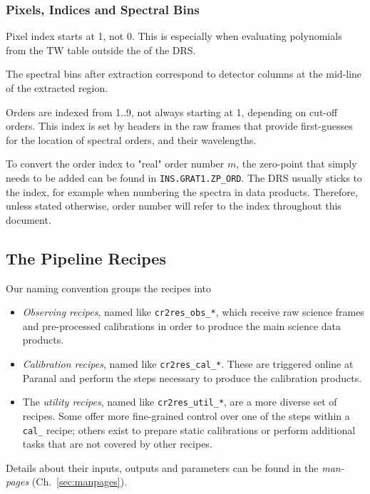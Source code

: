 \subsubsection{Pixels, Indices and Spectral Bins}
Pixel index starts at 1, not 0. This is especially when evaluating polynomials
from the TW table outside the of the DRS.

The spectral bins after extraction correspond to detector columns at the
mid-line of the extracted region.

Orders are indexed from 1..9, not always starting at 1, depending on cut-off
orders. This index is set by headers in the raw frames that provide first-guesses
for the location of spectral orders, and their wavelengths.

To convert the order index to "real" order number $m$, the zero-point that
simply needs to be added can be found in \texttt{INS.GRAT1.ZP\_ORD}. The DRS
usually sticks to the index, for example when numbering the spectra in data
products. Therefore, unless stated otherwise, order number will refer to the
index throughout this document.

\subsection{The Pipeline Recipes}
\label{sec:recipes-quick}

Our naming convention groups the recipes into
\begin{itemize}
    \item \textit{Observing recipes}, named like \texttt{cr2res\_obs\_*}, which
    receive raw science frames and pre-processed calibrations in order to
    produce the main science data products.
    \item \textit{Calibration recipes}, named like \texttt{cr2res\_cal\_*}.
    These are triggered online at Paranal and perform the steps necessary to
    produce the calibration products.
    \item The \textit{utility recipes}, named like \texttt{cr2res\_util\_*}, are
    a more diverse set of recipes. Some offer more fine-grained control over one
    of the steps within a \texttt{cal\_} recipe; others exist to prepare static
    calibrations or perform additional tasks that are not covered by other
    recipes.
\end{itemize}

Details about their inputs, outputs and parameters can be found in the
\emph{man-pages} (Ch.~\ref{sec:manpages}).


